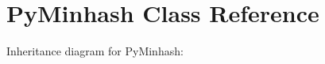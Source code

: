 \hypertarget{classPyMinhash}{}\section{Py\+Minhash Class Reference}
\label{classPyMinhash}


Inheritance diagram for Py\+Minhash\+:
